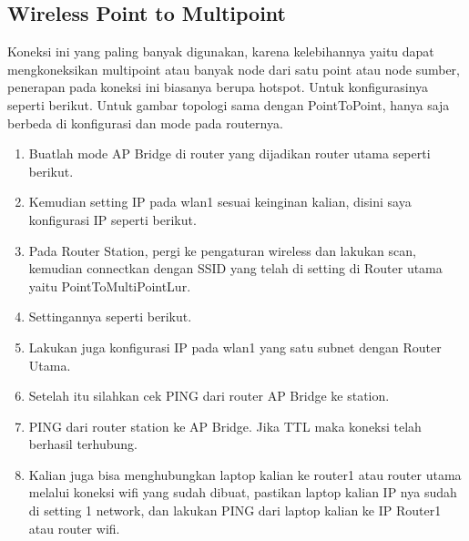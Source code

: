 \subsection{Wireless Point to Multipoint}
Koneksi ini yang paling banyak digunakan, karena kelebihannya yaitu dapat mengkoneksikan
multipoint atau banyak node dari satu point atau node sumber, penerapan pada koneksi ini
biasanya berupa hotspot. Untuk konfigurasinya seperti berikut.
Untuk gambar topologi sama dengan PointToPoint, hanya saja berbeda di konfigurasi dan
mode pada routernya.
\begin{center}
	\begin{enumerate}
		\item Buatlah mode AP Bridge di router yang dijadikan router utama seperti berikut.
		\item Kemudian setting IP pada wlan1 sesuai keinginan kalian, disini saya konfigurasi IP seperti berikut.
		\item Pada Router Station, pergi ke pengaturan wireless dan lakukan scan, kemudian connectkan dengan SSID yang telah di setting di Router utama yaitu PointToMultiPointLur.
		\item Settingannya seperti berikut.
		\item Lakukan juga konfigurasi IP pada wlan1 yang satu subnet dengan Router Utama.
		\item Setelah itu silahkan cek PING dari router AP Bridge ke station.
		\item PING dari router station ke AP Bridge. Jika TTL maka koneksi telah berhasil terhubung.
		\item Kalian juga bisa menghubungkan laptop kalian ke router1 atau router utama melalui koneksi wifi yang sudah dibuat, pastikan laptop kalian IP nya sudah di setting 1 network, dan lakukan PING dari laptop kalian ke IP Router1 atau router wifi.
	\end{enumerate}
\end{center}

